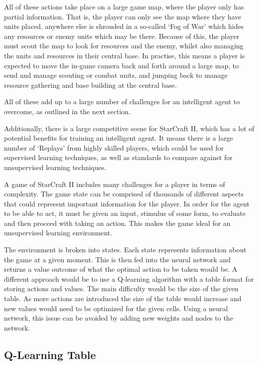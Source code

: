 All of these actions take place on a large game map, where the player only has
partial information. That is, the player can only see the map where they have
units placed, anywhere else is shrouded in a so-called `Fog of War' which hides
any resources or enemy units which may be there.
Because of this, the player must scout the map to look for resources and the
enemy, whilst also managing the units and resources in their central base.
In practise, this means a player is expected to move the in-game camera back
and forth around a large map, to send and manage scouting or combat units,
and jumping back to manage resource gathering and base building at the central
base.

All of these add up to a large number of challenges for an intelligent agent to
overcome, as outlined in the next section.

Additionally, there is a large competitive scene for StarCraft
II\cite{scIIprof}, which has a lot of potential benefits for training an
intelligent agent. It means there is a large number of `Replays' from highly
skilled players, which could be used for supervised learning techniques, as well
as standards to compare against for unsupervised learning techniques.


A game of StarCraft II includes many challenges for a player in terms of
complexity. The game state can be comprised of thousands of different aspects
that could represent important information for the player. In order for the
agent to be able to act, it must be given an input, stimulus of some form, to
evaluate and then proceed with taking an action. This makes the game ideal for
an unsupervised learning environment.

The environment is broken into states. Each state represents information about
the game at a given moment. This is then fed into the neural network and
returns a value outcome of what the optimal action to be taken would be. A
different approach would be to use a Q-learning algorithm with a table format
for storing actions and values. The main difficulty would be the size of the
given table. As more actions are introduced the size of the table would
increase and new values would need to be optimized for the given cells. Using a
neural network, this issue can be avoided by adding new weights and nodes to the
network.

\subsection{Q-Learning Table}


